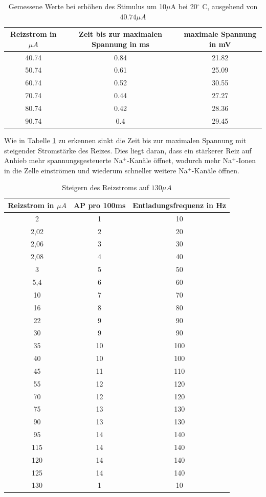 \documentclass[11pt]{article}
\begin{document}
\begin{table}[H]
\caption{Gemessene Werte bei erhöhen des Stimulus um 10$\mu$A bei 20$^\circ$ C, ausgehend von $40.74\mu A$}
\centering
\begin{adjustbox}{width=1.3\textwidth, center=\textwidth}
\begin{tabular}{c|c|c}
Reizstrom in $\mu A$ & Zeit bis zur maximalen Spannung in ms & maximale Spannung in mV \\
\hline\hline
40.74 & 0.84 & 21.82\\
50.74 & 0.61 & 25.09\\
60.74 & 0.52 & 30.55\\
70.74 & 0.44 & 27.27\\
80.74 & 0.42 & 28.36\\
90.74 & 0.4 & 29.45\\
\end{tabular}
\end{adjustbox}
\label{werte223}
\end{table} 

Wie in Tabelle \ref{werte223}  zu erkennen  sinkt die Zeit bis zur maximalen Spannung mit steigender Stromstärke des Reizes. Dies liegt daran, dass ein stärkerer Reiz auf Anhieb mehr spannungsgesteuerte Na$^+$-Kanäle öffnet, wodurch mehr Na$^+$-Ionen in die Zelle einströmen und wiederum schneller weitere Na$^+$-Kanäle öffnen. 

\begin{table}[H]
\caption{Steigern des Reizstroms auf $130 \mu A$}
\begin{center}
\begin{tabular}{c|c|c}
Reizstrom in $\mu A$ & AP pro 100ms & Entladungsfrequenz in Hz \\
\hline\hline
2	&	1	&	10	\\
2,02	&	2	&	20	\\
2,06	&	3	&	30	\\
2,08	&	4	&	40	\\
3	&	5	&	50	\\
5,4	&	6	&	60	\\
10	&	7	&	70	\\
16	&	8	&	80	\\
22	&	9	&	90	\\
30	&	9	&	90	\\
35	&	10	&	100	\\
40	&	10	&	100	\\
45	&	11	&	110	\\
55	&	12	&	120	\\
70	&	12	&	120	\\
75	&	13	&	130	\\
90	&	13	&	130	\\
95	&	14	&	140	\\
115	&	14	&	140	\\
120	&	14	&	140	\\
125	&	14	&	140	\\
130	&	1	&	10	
\end{tabular}
\end{center}
\label{werte224}
\end{table}
\end{document}
